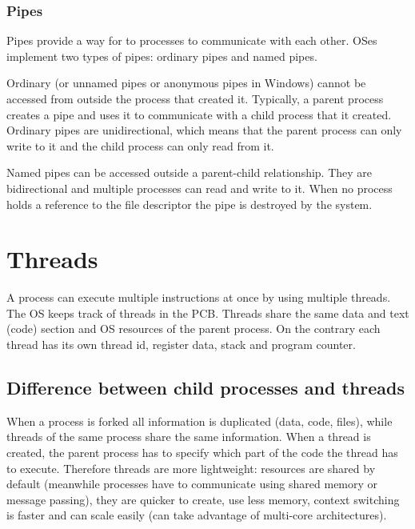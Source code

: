 \subsubsection{Pipes}
Pipes provide a way for to processes to communicate with each other. OSes implement two types of pipes: ordinary pipes and named pipes.

Ordinary (or unnamed pipes or anonymous pipes in Windows) cannot be accessed from outside the process that created it. Typically, a parent process creates a pipe and uses it to communicate with a child process that it created. Ordinary pipes are unidirectional, which means that the parent process can only write to it and the child process can only read from it.


Named pipes can be accessed outside a parent-child relationship. They are bidirectional and multiple processes can read and write to it. When no process holds a reference to the file descriptor the pipe is destroyed by the system.


\section{Threads}
A process can execute multiple instructions at once by using multiple threads. The OS keeps track of threads in the PCB. Threads share the same data and text (code) section and OS resources of the parent process. On the contrary each thread has its own thread id, register data, stack and program counter.


\subsection{Difference between child processes and threads}
When a process is forked all information is duplicated (data, code, files), while threads of the same process share the same information. When a thread is created, the parent process has to specify which part of the code the thread has to execute. Therefore threads are more lightweight: resources are shared by default (meanwhile processes have to communicate using shared memory or message passing), they are quicker to create, use less memory, context switching is faster and can scale easily (can take advantage of multi-core architectures).

